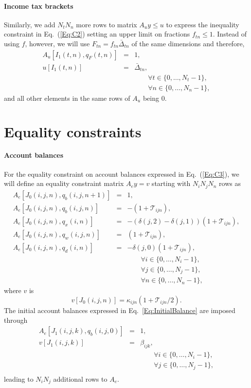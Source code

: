 \documentclass{report}[fleqn,12pt]
\begin{document}
\paragraph*{Income tax brackets}
Similarly, we add $N_t N_n$ more rows to matrix $A_uy \le u$ to express
the inequality constraint in Eq.~(\ref{Eq:C2})
setting an upper limit on fractions $f_{t n} \le 1$.
Instead of using $f$, however, we will use $F_{tn} = f_{tn}\bar{\Delta}_{tn}$
of the same dimensions and therefore,
\begin{eqnarray}
	A_u[I_1(t, n), q_F(t, n)] &=& 1, \nonumber \\
	u[I_1(t, n)] &=& \bar{\Delta}_{tn},\\
	&&\qquad\forall t \in \{0,\ldots, N_t-1\}, \nonumber\\
	&&\qquad\forall n \in \{0,\ldots, N_n -1\},\nonumber
\end{eqnarray}
and all other elements in the same rows of $A_u$ being $0$.

\section{Equality constraints}

\paragraph*{Account balances}
For the equality constraint on account balances expressed in Eq.~(\ref{Eq:C3}),
we will define an equality constraint matrix $A_ey = v$ starting
with $N_iN_jN_n$ rows as
\begin{eqnarray}
	\label{Eq:B1}
	A_e[J_0(i, j, n), q_b(i, j, n+1)] &=& 1, \nonumber \\
	A_e[J_0(i, j, n), q_b(i, j, n)] &=& -(1 + \mathcal{T}_{ijn}), \nonumber \\
	A_e[J_0(i, j, n), q_x(i, n)] &=& -(\delta(j, 2) - \delta(j, 1))(1 + \mathcal{T}_{ijn}), \nonumber \\
	A_e[J_0(i, j, n), q_w(i, j, n)] &=& (1 + \mathcal{T}_{ijn}), \nonumber \\
	A_e[J_0(i, j, n), q_d(i, n)] &=& -\delta(j, 0)(1 + \mathcal{T}_{ijn}), \\
	&&\qquad\forall i \in \{0,\ldots, N_i-1\},\nonumber\\
	&&\qquad\forall j \in \{0,\ldots, N_j-1\},\nonumber\\
	&&\qquad\forall n \in \{0,\ldots, N_n-1\}, \nonumber
\end{eqnarray}
where $v$ is
\begin{equation}
	v[J_0(i, j, n)] = \kappa_{ijn}(1 + \mathcal{T}_{ijn}/2).
\end{equation}
The initial account balances expressed in Eq.~\ref{Eq:InitialBalance} are imposed through
\begin{eqnarray}
	A_e[J_1(i, j, k), q_b(i, j, 0)] &=& 1, \nonumber \\
	v[J_1(i, j, k)] &=& \beta_{ijk},  \\
	&&\qquad\forall i \in \{0,\ldots, N_i-1\},\nonumber\\
	&&\qquad\forall j \in \{0,\ldots, N_j-1\},\nonumber\\
\end{eqnarray}
leading to $N_i N_j$ additional rows to $A_e$.
\end{document}
